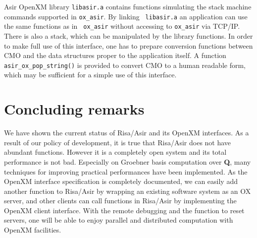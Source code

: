 \documentclass[runningheads]{cl2emult}
\begin{document}
Asir OpenXM library {\tt libasir.a} contains functions simulating the
stack machine commands supported in {\tt ox\_asir}.  By linking {\tt
libasir.a} an application can use the same functions as in {\tt
ox\_asir} without accessing to {\tt ox\_asir} via TCP/IP. There is
also a stack, which can be manipulated by the library functions. In
order to make full use of this interface, one has to prepare
conversion functions between CMO and the data structures proper to the
application itself.  A function {\tt asir\_ox\_pop\_string()} is
provided to convert CMO to a human readable form, which may be
sufficient for a simple use of this interface.

\section{Concluding remarks}
We have shown the current status of Risa/Asir and its OpenXM
interfaces. As a result of our policy of development, it is true that
Risa/Asir does not have abundant functions. However it is a completely
open system and its total performance is not bad. Especially on
Groebner basis computation over {\bf Q}, many techniques for improving
practical performances have been implemented. As the OpenXM interface
specification is completely documented, we can easily add another
function to Risa/Asir by wrapping an existing software system as an OX
server, and other clients can call functions in Risa/Asir by
implementing the OpenXM client interface.  With the remote debugging
and the function to reset servers, one will be able to enjoy parallel
and distributed computation with OpenXM facilities.
%
\end{document}
